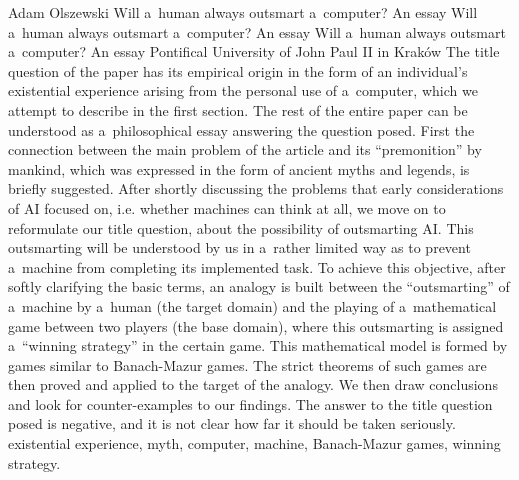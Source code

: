\begin{artengenv}{Adam Olszewski}
	{Will a~human always outsmart a~computer? An essay}
	{Will a~human always outsmart a~computer? An essay}
	{Will a~human always outsmart a~computer? An essay}
	{Pontifical University of John Paul II in Kraków}
	{The title question of the paper has its empirical origin in the form of an individual's existential experience arising from the personal use of a~computer, which we attempt to describe in the first section. The rest of the entire paper can be understood as a~philosophical essay answering the question posed. First the connection between the main problem of the article and its ``premonition'' by mankind, which was expressed in the form of ancient myths and legends, is briefly suggested. After shortly discussing the problems that early considerations of AI focused on, i.e. whether machines can think at all, we move on to reformulate our title question, about the possibility of outsmarting AI. This outsmarting will be understood by us in a~rather limited way as to prevent a~machine from completing its implemented task. To achieve this objective, after softly clarifying the basic terms, an analogy is built between the ``outsmarting'' of a~machine by a~human (the target domain) and the playing of a~mathematical game between two players (the base domain), where this outsmarting is assigned a~``winning strategy'' in the certain game. This mathematical model is formed by games similar to Banach-Mazur games. The strict theorems of such games are then proved and applied to the target of the analogy. We then draw conclusions and look for counter-examples to our findings. The answer to the title question posed is negative, and it is not clear how far it should be taken seriously.
	}
	{existential experience, myth, computer, machine, Banach-Mazur games, winning strategy.}
	
	\setcounter{section}{-1}
	

\end{artengenv}
